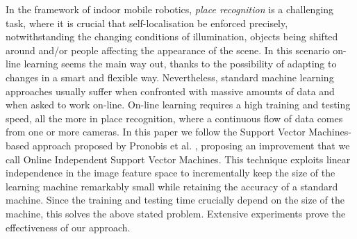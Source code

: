 In the framework of indoor mobile robotics, \emph{place recognition}
is a challenging task, where it is crucial that self-localisation be
enforced precisely, notwithstanding the changing conditions of
illumination, objects being shifted around and/or people affecting the
appearance of the scene. In this scenario on-line learning seems the
main way out, thanks to the possibility of adapting to changes in a
smart and flexible way. Nevertheless, standard machine learning
approaches usually suffer when confronted with massive amounts of data
and when asked to work on-line. On-line learning requires a high
training and testing speed, all the more in place recognition, where a
continuous flow of data comes from one or more cameras. In this paper
we follow the Support Vector Machines-based approach proposed by
Pronobis et al. \cite{pronobis:iros06}, proposing an improvement that
we call Online Independent Support Vector Machines. This technique
exploits linear independence in the image feature space to
incrementally keep the size of the learning machine remarkably small
while retaining the accuracy of a standard machine. Since the training
and testing time crucially depend on the size of the machine, this
solves the above stated problem. Extensive experiments prove the
effectiveness of our approach.
